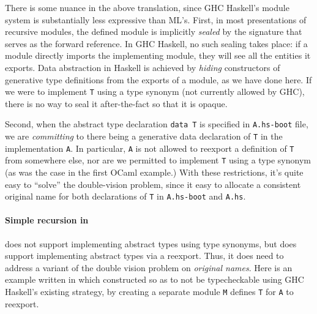 \noindent
There is some nuance in the above translation, since GHC Haskell's module
system is substantially less expressive than ML's.  First, in most
presentations of recursive modules, the defined module is implicitly
\emph{sealed} by the signature that serves as the forward reference.
In GHC Haskell, no such sealing takes place: if a module directly
imports the implementing module, they will see all the entities it
exports.  Data abstraction in Haskell is achieved by \emph{hiding}
constructors of generative type definitions from the exports of a module, as we
have done here. If we were to implement \verb|T| using a type synonym
(not currently allowed by GHC), there is no way to seal it after-the-fact
so that it is opaque.

Second, when the abstract type declaration \verb|data T| is specified in
\verb|A.hs-boot| file, we are \emph{committing} to there being a
generative data declaration of \verb|T| in the implementation \verb|A|.
In particular, \verb|A| is not allowed to reexport a definition of
\verb|T| from somewhere else, nor are we permitted to implement \verb|T|
using a type synonym (as was the case in the first OCaml example.)
With these restrictions, it's quite easy to ``solve'' the double-vision
problem, since it easy to allocate a consistent original name for both
declarations of \verb|T| in \verb|A.hs-boot| and \verb|A.hs|.

\paragraph{Simple recursion in \OldBackpack{}}
\OldBackpack{} does not support implementing abstract types using type
synonyms, but does support implementing abstract types via a reexport.
Thus, it does need to address a variant of the double vision problem
on \emph{original names}.  Here is an example written in \OldBackpack{}
which constructed so as to not be typecheckable using GHC Haskell's existing strategy,
by creating a separate module \verb|M| defines \verb|T|
for \verb|A| to reexport.

